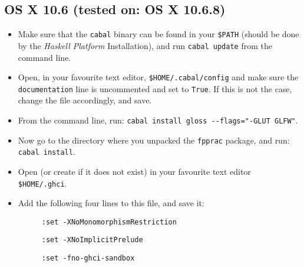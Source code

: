 \documentclass[]{article}
\begin{document}
\subsection{OS X 10.6 (tested on: OS X 10.6.8)}
\begin{itemize}
  \item Make sure that the \texttt{cabal} binary can be found in your \texttt{\$PATH} (should be done by the \emph{Haskell Platform} Installation), and run \texttt{cabal update} from the command line.
  \item Open, in your favourite text editor, \texttt{\$HOME/.cabal/config} and make sure the \texttt{documentation} line is uncommented and set to \texttt{True}. If this is not the case, change the file accordingly, and save.
  \item From the command line, run: \texttt{cabal install gloss -{}-flags="-GLUT GLFW"}.
  \item Now go to the directory where you unpacked the \texttt{fpprac} package, and run: \texttt{cabal install}.
  \item Open (or create if it does not exist) in your favourite text editor \texttt{\$HOME/.ghci}.
  \item Add the following four lines to this file, and save it:
  \begin{description}
    \item[] \texttt{:set -XNoMonomorphismRestriction}
    \item[] \texttt{:set -XNoImplicitPrelude}
    \item[] \texttt{:set -fno-ghci-sandbox}
  \end{description}
\end{itemize}
\end{document}
